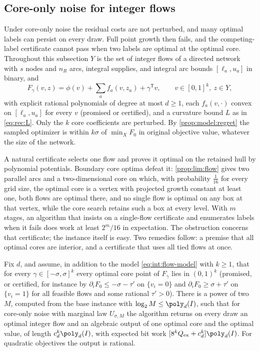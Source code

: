 \subsection{Core-only noise for integer flows}\label{sec:int:flows}

Under core-only noise the residual costs are not perturbed, and many optimal
labels can persist on every draw. Full point growth then fails, and the
competing-label certificate cannot pass when two labels are optimal at the
optimal core. Throughout this subsection $Y$ is the set of integer flows of a
directed network with $s$ nodes and $n_R$ arcs, integral supplies, and
integral arc bounds $[\ell_a,u_a]$ in binary, and
\begin{equation}\label{eq:int:flow-model}
 F_\gamma(v,z)=\phi(v)+\sum_af_a(v,z_a)+\gamma^{\mathsf T}v,
 \qquad v\in[0,1]^k,\ z\in Y,
\end{equation}
with explicit rational polynomials of degree at most $d\ge1$, each
$f_a(v,\cdot)$ convex on $[\ell_a,u_a]$ for every $v$ (promised or certified),
and a curvature bound $L$ as in \eqref{eq:rec:L}. Only the $k$ core
coefficients are perturbed. By \cref{prop:model:regret} the sampled optimizer
is within $k\sigma$ of $\min_XF_0$ in original objective value, whatever the
size of the network.

A natural certificate selects one flow and proves it optimal on the retained
hull by polynomial potentials. Boundary core optima defeat it:
\cref{prop:lim:flow} gives two parallel arcs and a two-dimensional core on
which, with probability $\frac1{16}$ for every grid size, the optimal core
is a vertex with projected growth constant at least one, both flows are
optimal there, and no single flow is optimal on any box at that vertex,
while the core search retains such a box at every level. With $m$ stages,
an algorithm that insists on a single-flow certificate and enumerates
labels when it fails does work at least $2^m/16$ in expectation. The
obstruction concerns that certificate; the instance itself is easy. Two
remedies follow: a premise that all optimal cores are interior, and a
certificate that uses all tied flows at once.

\begin{theorem}\label{thm:int:flow-interior}
Fix $d$, and assume, in addition to the model \eqref{eq:int:flow-model} with
$k\ge1$, that for every $\gamma\in[-\sigma,\sigma]^k$ every optimal core point
of $F_\gamma$ lies in $(0,1)^k$ (promised, or certified, for instance by
$\partial_iF_0\le-\sigma-\tau'$ on $\{v_i=0\}$ and $\partial_iF_0\ge\sigma+\tau'$
on $\{v_i=1\}$ for all feasible flows and some rational $\tau'>0$). There is a
power of two $M$, computed from the base instance with $\log_2M\le\poly_d(I)$,
such that for core-only noise with marginal law $U_{\sigma,M}$ the algorithm
returns on every draw an optimal integer flow and an algebraic output of one
optimal core and the optimal value, of length $c_d^k\poly_d(I)$, with expected
bit work $[8^kQ_{\rm ex}+c_d^k]\poly_d(I)$. For quadratic objectives the output
is rational.
\end{theorem}

